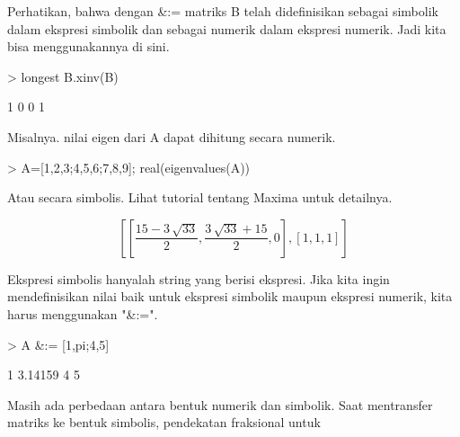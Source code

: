 \documentclass[a4paper,10pt]{article}
\begin{document}
\begin{eulernotebook}
\begin{eulercomment}
\begin{eulercomment}
\begin{eulercomment}
\begin{eulercomment}
\begin{eulercomment}
\begin{eulercomment}
\begin{eulercomment}
Perhatikan, bahwa dengan \&:= matriks B telah didefinisikan sebagai
simbolik dalam ekspresi simbolik dan sebagai numerik dalam ekspresi
numerik. Jadi kita bisa menggunakannya di sini.
\end{eulercomment}
\begin{eulerprompt}
> longest B.xinv(B)
\end{eulerprompt}
\begin{euleroutput}
                        1                       0 
                        0                       1 
\end{euleroutput}
\begin{eulercomment}
Misalnya. nilai eigen dari A dapat dihitung secara numerik.
\end{eulercomment}
\begin{eulerprompt}
> A=[1,2,3;4,5,6;7,8,9]; real(eigenvalues(A))
\end{eulerprompt}
\begin{euleroutput}
  [16.1168,  -1.11684,  0]
\end{euleroutput}
\begin{eulercomment}
Atau secara simbolis. Lihat tutorial tentang Maxima untuk detailnya.
\end{eulercomment}
\begin{eulerformula}
\[
\left[ \left[ \frac{15-3\,\sqrt{33}}{2} , \frac{3\,\sqrt{33}+15}{2}   , 0 \right]  , \left[ 1 , 1 , 1 \right]  \right] 
\]
\end{eulerformula}
\begin{eulercomment}
\begin{eulercomment}
\begin{eulercomment}
Ekspresi simbolis hanyalah string yang berisi ekspresi. Jika kita
ingin mendefinisikan nilai baik untuk ekspresi simbolik maupun
ekspresi numerik, kita harus menggunakan "\&:=".
\end{eulercomment}
\begin{eulerprompt}
> A &:= [1,pi;4,5]
\end{eulerprompt}
\begin{euleroutput}
              1       3.14159 
              4             5 
\end{euleroutput}
\begin{eulercomment}
Masih ada perbedaan antara bentuk numerik dan simbolik. Saat
mentransfer matriks ke bentuk simbolis, pendekatan fraksional untuk

\end{eulercomment}
\end{eulercomment}
\end{eulercomment}
\end{eulercomment}
\end{eulercomment}
\end{eulercomment}
\end{eulercomment}
\end{eulercomment}
\end{eulercomment}
\end{eulernotebook}
\end{document}
